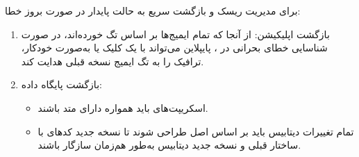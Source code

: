 برای مدیریت ریسک و بازگشت سریع به حالت پایدار در صورت بروز خطا:

\begin{enumerate}
    \item {بازگشت اپلیکیشن:}
    از آنجا که تمام ایمیج‌ها بر اساس  تگ خورده‌اند، در صورت شناسایی خطای بحرانی در ، پایپلاین می‌تواند با یک کلیک یا به‌صورت خودکار، ترافیک را به تگ ایمیج نسخه قبلی هدایت کند.
    
    \item {بازگشت پایگاه داده:}
    \begin{itemize}
        \item اسکریپت‌های  باید همواره دارای متد  باشند.
        \item تمام تغییرات دیتابیس باید بر اساس اصل  طراحی شوند تا نسخه جدید کدهای  با ساختار قبلی و نسخه جدید دیتابیس به‌طور هم‌زمان سازگار باشند.
    \end{itemize}
\end{enumerate}
